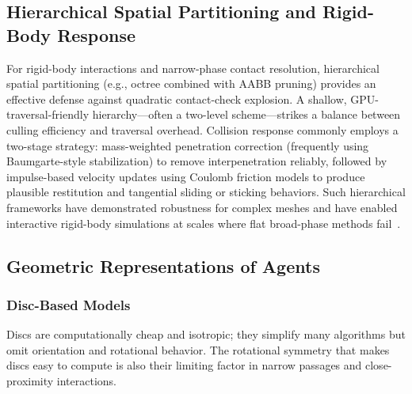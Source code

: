 \subsection{Hierarchical Spatial Partitioning and Rigid-Body Response}
For rigid-body interactions and narrow-phase contact resolution, hierarchical spatial partitioning (e.g., octree combined with AABB pruning) provides an effective defense against quadratic contact-check explosion. A shallow, GPU-traversal-friendly hierarchy—often a two-level scheme—strikes a balance between culling efficiency and traversal overhead. Collision response commonly employs a two-stage strategy: mass-weighted penetration correction (frequently using Baumgarte-style stabilization) to remove interpenetration reliably, followed by impulse-based velocity updates using Coulomb friction models to produce plausible restitution and tangential sliding or sticking behaviors. Such hierarchical frameworks have demonstrated robustness for complex meshes and have enabled interactive rigid-body simulations at scales where flat broad-phase methods fail~\cite{sung}.


\subsection{Geometric Representations of Agents}
\label{sec:geom}

\subsubsection{Disc-Based Models}
Discs are computationally cheap and isotropic; they simplify many algorithms but omit orientation and rotational behavior. The rotational symmetry that makes discs easy to compute is also their limiting factor in narrow passages and close-proximity interactions.

